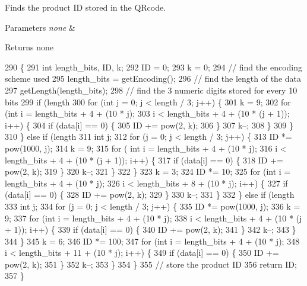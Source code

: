 Finds the product ID stored in the Q\+Rcode. 


\begin{DoxyParams}{Parameters}
{\em none} & \\
\hline
\end{DoxyParams}
\begin{DoxyReturn}{Returns}
none 
\end{DoxyReturn}

\begin{DoxyCode}
290                           \{
291   \textcolor{keywordtype}{int} length\_bits, ID, k;
292   ID = 0;
293   k = 0;
294   \textcolor{comment}{// find the encoding scheme used}
295   length\_bits = getEncoding();
296   \textcolor{comment}{// find the length of the data}
297   getLength(length\_bits);
298   \textcolor{comment}{// find the 3 numeric digits stored for every 10 bits}
299   \textcolor{keywordflow}{if} (length %
300     \textcolor{keywordflow}{for} (\textcolor{keywordtype}{int} j = 0; j < length / 3; j++) \{
301      k = 9;
302      \textcolor{keywordflow}{for} (\textcolor{keywordtype}{int} i = length\_bits + 4 + (10 * j);
303           i < length\_bits + 4 + (10 * (j + 1)); i++) \{
304       \textcolor{keywordflow}{if} (data[i] == 0) \{
305        ID += pow(2, k);
306       \}
307      k--;
308      \}
309     \}
310   \} \textcolor{keywordflow}{else} \textcolor{keywordflow}{if} (length %
311   \textcolor{keywordtype}{int} j;
312   \textcolor{keywordflow}{for} (j = 0; j < length / 3; j++) \{
313      ID *= pow(1000, j);
314      k = 9;
315      \textcolor{keywordflow}{for} ( \textcolor{keywordtype}{int} i = length\_bits + 4 + (10 * j);
316                   i < length\_bits + 4 + (10 * (j + 1)); i++) \{
317       \textcolor{keywordflow}{if} (data[i] == 0) \{
318        ID += pow(2, k);
319       \}
320      k--;
321      \}
322     \}
323     k = 3;
324     ID *= 10;
325     \textcolor{keywordflow}{for} (\textcolor{keywordtype}{int} i = length\_bits + 4 + (10 * j);
326           i < length\_bits + 8 + (10 * j); i++) \{
327       \textcolor{keywordflow}{if} (data[i] == 0) \{
328        ID += pow(2, k);
329       \}
330     k--;
331     \}
332   \} \textcolor{keywordflow}{else} \textcolor{keywordflow}{if} (length %
333   \textcolor{keywordtype}{int} j;
334   \textcolor{keywordflow}{for} (j = 0; j < length / 3; j++) \{
335      ID *= pow(1000, j);
336      k = 9;
337      \textcolor{keywordflow}{for} (\textcolor{keywordtype}{int} i = length\_bits + 4 + (10 * j);
338            i < length\_bits + 4 + (10 * (j + 1)); i++) \{
339       \textcolor{keywordflow}{if} (data[i] == 0) \{
340        ID += pow(2, k);
341       \}
342      k--;
343      \}
344     \}
345     k = 6;
346     ID *= 100;
347     \textcolor{keywordflow}{for} (\textcolor{keywordtype}{int} i = length\_bits + 4 + (10 * j);
348             i < length\_bits + 11 + (10 * j); i++) \{
349       \textcolor{keywordflow}{if} (data[i] == 0) \{
350         ID += pow(2, k);
351       \}
352     k--;
353     \}
354   \}
355   \textcolor{comment}{// store the product ID}
356   \textcolor{keywordflow}{return} ID;
357 \}
\end{DoxyCode}


